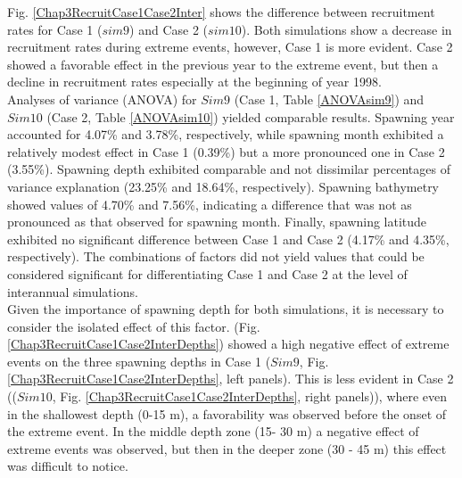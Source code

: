 Fig. \ref{Chap3RecruitCase1Case2Inter} shows the difference between recruitment rates for Case 1 ($sim9$) and Case 2 ($sim10$). Both simulations show a decrease in recruitment rates during extreme events, however, Case 1 is more evident. Case 2 showed a favorable effect in the previous year to the extreme event, but then a decline in recruitment rates especially at the beginning of year 1998.\\

Analyses of variance (ANOVA) for $Sim9$ (Case 1, Table \ref{ANOVAsim9}) and $Sim10$ (Case 2, Table \ref{ANOVAsim10}) yielded comparable results. Spawning year accounted for 4.07\% and 3.78\%, respectively, while spawning month exhibited a relatively modest effect in Case 1 (0.39\%) but a more pronounced one in Case 2 (3.55\%). Spawning depth exhibited comparable and not dissimilar percentages of variance explanation (23.25\% and 18.64\%, respectively). Spawning bathymetry showed values of 4.70\% and 7.56\%, indicating a difference that was not as pronounced as that observed for spawning month. Finally, spawning latitude exhibited no significant difference between Case 1 and Case 2 (4.17\% and 4.35\%, respectively). The combinations of factors did not yield values that could be considered significant for differentiating Case 1 and Case 2 at the level of interannual simulations.\\

Given the importance of spawning depth for both simulations, it is necessary to consider the isolated effect of this factor. (Fig. \ref{Chap3RecruitCase1Case2InterDepths}) showed a high negative effect of extreme events on the three spawning depths in Case 1 ($Sim9$, Fig. \ref{Chap3RecruitCase1Case2InterDepths}, left panels). This is less evident in Case 2 (($Sim10$, Fig. \ref{Chap3RecruitCase1Case2InterDepths}, right panels)), where even in the shallowest depth (0-15 m), a favorability was observed before the onset of the extreme event. In the middle depth zone (15- 30 m) a negative effect of extreme events was observed, but then in the deeper zone (30 - 45 m) this effect was difficult to notice.

